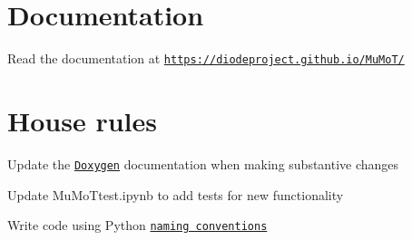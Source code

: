 \section*{Documentation}

Read the documentation at \href{https://diodeproject.github.io/MuMoT/}{\tt https\+://diodeproject.\+github.\+io/\+Mu\+Mo\+T/}

\section*{House rules}


\begin{DoxyItemize}
\item Update the \href{http://www.stack.nl/~dimitri/doxygen/index.html}{\tt Doxygen} documentation when making substantive changes
\item Update \textquotesingle{}Mu\+Mo\+Ttest.\+ipynb\textquotesingle{} to add tests for new functionality
\item Write code using Python \href{https://www.python.org/dev/peps/pep-0008/#naming-conventions}{\tt naming conventions} 
\end{DoxyItemize}